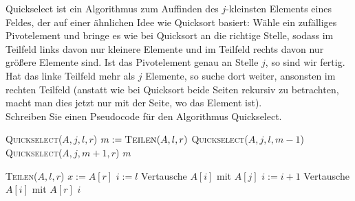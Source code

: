 
\begin{exercise}

Quickselect ist ein Algorithmus zum Auffinden des $j$-kleinsten Elements eines
Feldes, der auf einer ähnlichen Idee wie Quicksort basiert: Wähle ein zufälliges
Pivotelement und bringe es wie bei Quicksort an die richtige Stelle, sodass im
Teilfeld links davon nur kleinere Elemente und im Teilfeld rechts davon nur
größere Elemente sind. Ist das Pivotelement genau an
Stelle $j$, so sind wir fertig. Hat das linke Teilfeld mehr als $j$ Elemente,
so suche dort weiter, ansonsten im rechten Teilfeld (anstatt wie bei Quicksort beide
Seiten rekursiv zu betrachten, macht man dies jetzt nur mit der Seite, wo das Element ist). \\
Schreiben Sie einen Pseudocode für den Algorithmus Quickselect.

\end{exercise}



\begin{solution}

\phantom{}

\begin{algorithmic}[1]
  \State \textsc{Quickselect}($A,j,l,r$)
    \State $m := \textsc{Teilen}(A,l,r)$
      \State \textsc{Quickselect}($A,j,l,m-1$)
      \State \textsc{Quickselect}($A,j,m+1,r$)
      \State \Return $m$
    \EndIf
  \EndIf
\end{algorithmic}

\begin{algorithmic}[1]
  \State \textsc{Teilen}($A,l,r$)
  \State $x := A[r]$
  \State $i := l$
      \State Vertausche $A[i]$ mit $A[j]$
      \State $i := i + 1$
    \EndIf
  \EndFor
  \State Vertausche $A[i]$ mit $A[r]$
  \State \Return $i$
\end{algorithmic}

\end{solution}
